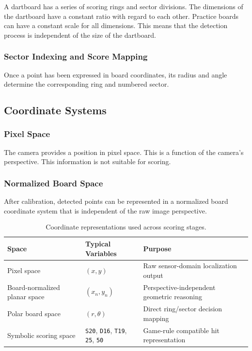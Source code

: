 A dartboard has a series of scoring rings and sector divisions. The dimensions of the dartboard have a constant ratio with regard to each other. Practice boards can have a constant scale for all dimensions. This means that the detection process is independent of the size of the dartboard.

\subsubsection{Sector Indexing and Score Mapping}

Once a point has been expressed in board coordinates, its radius and angle determine the corresponding ring and numbered sector.

\subsection{Coordinate Systems}

\subsubsection{Pixel Space}

The camera provides a position in pixel space. This is a function of the camera's perspective. This information is not suitable for scoring.

\subsubsection{Normalized Board Space}

After calibration, detected points can be represented in a normalized board coordinate system that is independent of the raw image perspective.

\begin{table}[H]
    \centering
    \begin{tabularx}{\linewidth}{@{}X X X@{}}
        \toprule
        \textbf{Space} & \textbf{Typical Variables} & \textbf{Purpose} \\
        \midrule
        Pixel space & $(x, y)$ & Raw sensor-domain localization output \\
        Board-normalized planar space & $(x_n, y_n)$ & Perspective-independent geometric reasoning \\
        Polar board space & $(r, \theta)$ & Direct ring/sector decision mapping \\
        Symbolic scoring space & \texttt{S20}, \texttt{D16}, \texttt{T19}, \texttt{25}, \texttt{50} & Game-rule compatible hit representation \\
        \bottomrule
    \end{tabularx}
    \caption{Coordinate representations used across scoring stages.}
    \label{tab:coordinate_spaces}
\end{table}

